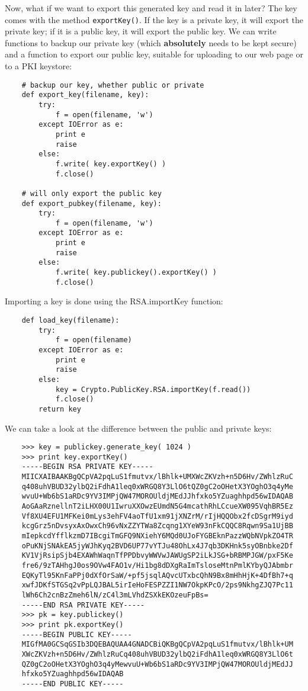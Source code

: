\documentclass[letterpaper,10pt]{article}
\begin{document}
Now, what if we want to export this generated key and read it in later? The key
comes with the method \verb|exportKey()|. If the key is a private key, it will
export the private key; if it is a public key, it will export the public key.
We can write functions to backup our private key (which \textbf{absolutely}
needs to be kept secure) and a function to export our public key, suitable for
uploading to our web page or to a PKI keystore:
\begin{verbatim}
    # backup our key, whether public or private
    def export_key(filename, key):
        try:
            f = open(filename, 'w')
        except IOError as e:
            print e
            raise
        else:
            f.write( key.exportKey() )
            f.close()

    # will only export the public key
    def export_pubkey(filename, key):
        try:
            f = open(filename, 'w')
        except IOError as e:
            print e
            raise
        else:
            f.write( key.publickey().exportKey() )
            f.close()
\end{verbatim}

Importing a key is done using the RSA.importKey function:
\begin{verbatim}
    def load_key(filename):
        try:
            f = open(filename)
        except IOError as e:
            print e
            raise
        else:
            key = Crypto.PublicKey.RSA.importKey(f.read())
            f.close()
        return key

\end{verbatim}

We can take a look at the difference between the public and private keys:
\begin{verbatim}
    >>> key = publickey.generate_key( 1024 )
    >>> print key.exportKey()
    -----BEGIN RSA PRIVATE KEY-----
    MIICXAIBAAKBgQCpVA2pqLuS1fmutvx/lBhlk+UMXWcZKVzh+n5D6Hv/ZWhlzRuC
    q408uhVBUD32ylbQ2iFdhA1leq0xWRGQ8Y3LlO6tQZ0gC2oOHetX3YOghO3q4yMe
    wvuU+Wb6bS1aRDc9YV3IMPjQW47MOROUldjMEdJJhfxko5YZuaghhpd56wIDAQAB
    AoGAaRznellnT2iLHX00U1IwruXXOwzEUmdN5G4mcathRhLCcueXW095VqhBR5Ez
    Vf8XU4EFU1MFKei0mLys3ehFV4aoTfU1xm91jXNZrM/rIjHQQObx2fcDSgrM9iyd
    kcgGrz5nDvsyxAxOwxCh96vNxZZYTWa8Zcqng1XYeW93nFkCQQC8Rqwn9Sa1UjBB
    mIepkcdYfflkzmD7IBcgiTmGFQ9NXiehY6MQd0UJoFYGBEknPazzWQbNVpkZO4TR
    oPuKNjSNAkEA5jyWJhKyq2BVD6UP77vYTJu48OhLx4J7qb3DKHnk5syOBnbke2Df
    KV1VjRsipSjb4EXAWhWaqnTfPPDbvyWWVwJAWUgSP2iLkJSG+bRBMPJGW/pxF5Ke
    fre6/9zTAHhgJ0os9OVw4FAO1v/Hi1bg8dDXgRaImTsloseMtnPmlKYbyQJAbmbr
    EQKyTl95KnFaPPj0dXfOrSaW/+pf5jsqlAQvcUTxbcQhN9Bx8mHhHjK+4DfBh7+q
    xwfJDKfSTGSq2vPpLQJBAL5irIeHoFESPZZI1NW7OkpKPcO/2ps9NkhgZJQ7Pc11
    lWh6Ch2cnBzZmeh6lN/zC4l3mLVhdZSXkEKOzeuFpBs=
    -----END RSA PRIVATE KEY-----
    >>> pk = key.publickey()
    >>> print pk.exportKey()
    -----BEGIN PUBLIC KEY-----
    MIGfMA0GCSqGSIb3DQEBAQUAA4GNADCBiQKBgQCpVA2pqLuS1fmutvx/lBhlk+UM
    XWcZKVzh+n5D6Hv/ZWhlzRuCq408uhVBUD32ylbQ2iFdhA1leq0xWRGQ8Y3LlO6t
    QZ0gC2oOHetX3YOghO3q4yMewvuU+Wb6bS1aRDc9YV3IMPjQW47MOROUldjMEdJJ
    hfxko5YZuaghhpd56wIDAQAB
    -----END PUBLIC KEY-----
\end{verbatim}
\end{document}
